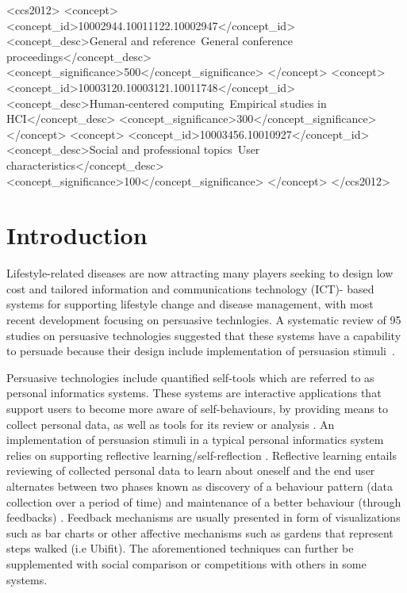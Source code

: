 \documentclass{sig-alternate}
\begin{document}
\begin{CCSXML}
<ccs2012>
<concept>
<concept_id>10002944.10011122.10002947</concept_id>
<concept_desc>General and reference~General conference proceedings</concept_desc>
<concept_significance>500</concept_significance>
</concept>
<concept>
<concept_id>10003120.10003121.10011748</concept_id>
<concept_desc>Human-centered computing~Empirical studies in HCI</concept_desc>
<concept_significance>300</concept_significance>
</concept>
<concept>
<concept_id>10003456.10010927</concept_id>
<concept_desc>Social and professional topics~User characteristics</concept_desc>
<concept_significance>100</concept_significance>
</concept>
</ccs2012>
\end{CCSXML}


%
%

%
%
\printccsdesc



\section{Introduction} 
Lifestyle-related diseases are now attracting many players seeking to design low cost and tailored information and communications technology (ICT)- based systems for supporting lifestyle change and disease management\cite{arsand:mobile}, with most recent development focusing on persuasive technlogies. A systematic review of 95 studies on persuasive technologies suggested that these systems have a capability to persuade because their design include implementation of persuasion stimuli~\cite{hamari2014persuasive}.

Persuasive technologies include quantified self-tools which are referred to as personal informatics systems. These systems are interactive applications that support users to become more aware of self-behaviours, by providing means to collect personal data, as well as tools for its review or analysis \cite{li2011:personal,li2012:personal}. An implementation of persuasion stimuli in a typical personal informatics system relies on supporting reflective learning/self-reflection \cite{li2011:understanding}. Reflective learning entails reviewing of collected personal data to learn about oneself and the end user alternates between two phases known as discovery of a behaviour pattern (data collection over a period of time) and maintenance of a better behaviour (through feedbacks) \cite{li2011:understanding}. Feedback mechanisms are usually presented in form of visualizations such as bar charts or other affective mechanisms such as gardens that represent steps walked (i.e Ubifit\cite{klasnja2009:using}). The aforementioned techniques can further be supplemented with social comparison\cite{Oinas-kukkonen:psd} or competitions with others\cite{comber2013:designing} in some systems.
\end{document}
